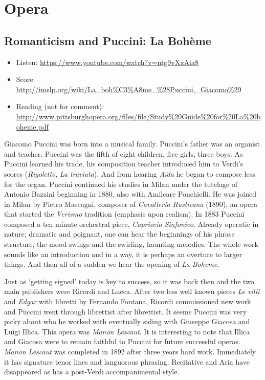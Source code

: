 
\chapter{Opera}
\label{opera}


\section{Romanticism and Puccini: La Boh\`eme}
\begin{itemize}
\item Listen: \url{https://www.youtube.com/watch?v=ntg9vXxAia8}
\item Score: \url{http://imslp.org/wiki/La_boh%C3%A8me_%28Puccini,_Giacomo%29}
\item Reading (not for comment): \url{http://www.pittsburghopera.org/files/file/Study%20Guide%20for%20La%20boheme.pdf}
\end{itemize}

Giacomo Puccini was born into a musical family. Puccini's father was an organist and teacher. Puccini was the fifth of eight children, five girls, three boys. As Puccini learned his trade, his composition teacher introduced him to Verdi's scores (\textit{Rigoletto}, \textit{La traviata}). And from hearing \textit{A\"ida} he began to compose less for the organ. Puccini continued his studies in Milan under the tutelage of Antonio Bazzini beginning in 1880, also with Amilcare Ponchielli. He was joined in Milan by Pietro Mascagni, composer of \textit{Cavalleria Rusticana} (1890), an opera that started the \textit{Verismo} tradition (emphasis upon realism). In 1883 Puccini composed a ten minute orchestral piece, \textit{Capriccio Sinfonico}. Already operatic in nature; dramatic and poignant, one  can hear the beginnings of his phrase structure, the mood swings and the swirling, haunting melodies. The whole work sounds like an introduction and in a way, it is perhaps an overture to larger things. And then all of a sudden we hear the opening of \textit{La Boheme}. 

Just as `getting signed' today is key to success, so it was back then and the two main publishers were Ricordi and Lucca. After two less well known pieces \textit{Le villi} and \textit{Edgar} with libretti by Fernando Fontana, Ricordi commissioned new work and Puccini went through librettist after librettist. It seems Puccini was very picky about who he worked with eventually siding with Giuseppe Giacosa and Luigi Illica. This opera was \textit{Manon Lescaut}. It is interesting to note that Illica and Giacosa were to remain faithful to Puccini for future successful operas. \textit{Manon Lescaut} was completed in 1892 after three years hard work. Immediately it has signature tenor lines and languorous phrasing. Recitative and Aria have disappeared as has a post-Verdi accompanimental style. 

